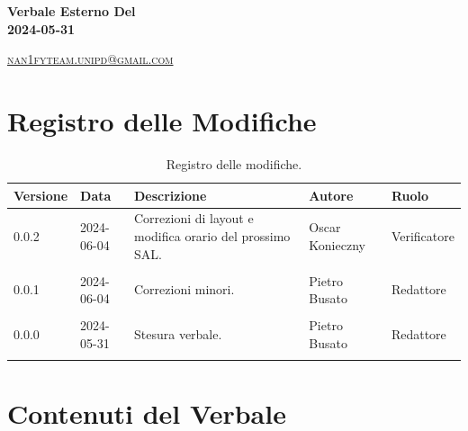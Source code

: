 \documentclass[8pt]{article}
\begin{document}
\begin{titlepage}
\begin{minipage}[t]{0.47\textwidth}
{		}
		\vspace{4mm}\vspace{4mm}
	\end{minipage}
	\vspace{4cm}
	\begin{center}
		\begin{flushright}
			{\fontsize{30pt}{52pt}\selectfont \textbf{Verbale Esterno Del\\2024-05-31\\}} %
		\end{flushright}
		\vspace{3cm}
	\end{center}
	\vspace{8 cm}
	{\small \textsc{\href{mailto: nan1fyteam.unipd@gmail.com}{nan1fyteam.unipd@gmail.com}}}
\end{titlepage}
\pagestyle{mystyle}

\section*{Registro delle Modifiche}
\begin{table}[ht!]	
	\centering
	\begin{tabular}{p{1.2cm} p{2cm} p{6cm} p{3cm} p{2cm}}
		\toprule
		\textbf{Versione}& \textbf{Data} & \textbf{Descrizione} & \textbf{Autore} & \textbf{Ruolo} \\
		\midrule
		0.0.2 & 2024-06-04 & Correzioni di layout e modifica orario del prossimo SAL. & Oscar Konieczny & Verificatore \\\\
		0.0.1 & 2024-06-04 & Correzioni minori. & Pietro Busato & Redattore \\\\ 
		0.0.0 & 2024-05-31 & Stesura verbale.  & Pietro Busato & Redattore \\\\ %
		\bottomrule
	\end{tabular}
	\caption{Registro delle modifiche.}
	\label{table:Registro delle modifiche}
\end{table}
\newpage
\tableofcontents
\clearpage
\newpage
\justifying
\section{Contenuti del Verbale}
\end{document}

